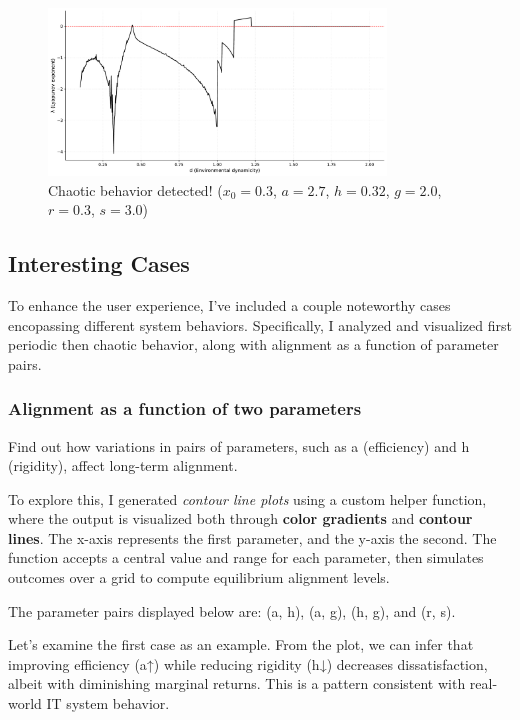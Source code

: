 \documentclass[a4paper, 10pt]{article}
\begin{document}
\begin{figure}[H]
	\centering
	\includegraphics[width=0.8\textwidth]{../images/results/lyapunov.pdf}
	\caption{Chaotic behavior detected! ($x_0 = 0.3$, $a = 2.7$, $h = 0.32$, $g = 2.0$, $r = 0.3$, $s = 3.0$)}
	\label{fig:lyapunov}
\end{figure}

\clearpage

\subsection{Interesting Cases}
To enhance the user experience, I've included a couple noteworthy cases encopassing different system behaviors. Specifically, I analyzed and visualized first periodic then chaotic behavior, along with alignment as a function of parameter pairs.

\subsubsection{Alignment as a function of two parameters}
Find out how variations in pairs of parameters, such as a (efficiency) and h (rigidity), affect long-term alignment.

To explore this, I generated \textit{contour line plots} using a custom helper function, where the output is visualized both through \textbf{color gradients} and \textbf{contour lines}.
The x-axis represents the first parameter, and the y-axis the second. The function accepts a central value and range for each parameter, then simulates outcomes over a grid to compute equilibrium alignment levels.

The parameter pairs displayed below are: (a, h), (a, g), (h, g), and (r, s).

Let’s examine the first case as an example. From the plot, we can infer that improving efficiency (a↑) while reducing rigidity (h↓) decreases dissatisfaction, albeit with diminishing marginal returns.  
This is a pattern consistent with real-world IT system behavior.
\end{document}
